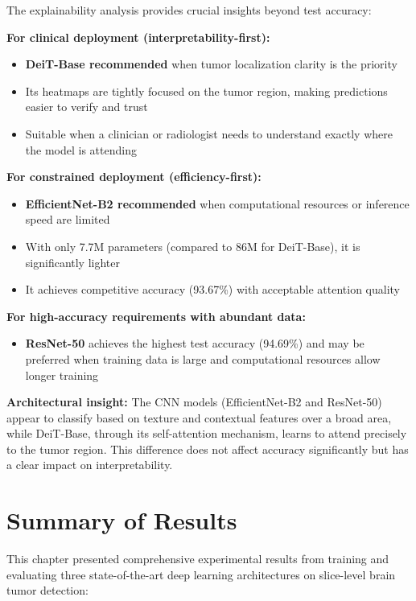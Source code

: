 The explainability analysis provides crucial insights beyond test accuracy:

\textbf{For clinical deployment (interpretability-first):}
\begin{itemize}
    \item \textbf{DeiT-Base recommended} when tumor localization clarity is the priority
    \item Its heatmaps are tightly focused on the tumor region, making predictions easier to verify and trust
    \item Suitable when a clinician or radiologist needs to understand exactly where the model is attending
\end{itemize}

\textbf{For constrained deployment (efficiency-first):}
\begin{itemize}
    \item \textbf{EfficientNet-B2 recommended} when computational resources or inference speed are limited
    \item With only 7.7M parameters (compared to 86M for DeiT-Base), it is significantly lighter
    \item It achieves competitive accuracy (93.67\%) with acceptable attention quality
\end{itemize}

\textbf{For high-accuracy requirements with abundant data:}
\begin{itemize}
    \item \textbf{ResNet-50} achieves the highest test accuracy (94.69\%) and may be preferred when training data is large and computational resources allow longer training
\end{itemize}

\textbf{Architectural insight:}
The CNN models (EfficientNet-B2 and ResNet-50) appear to classify based on texture and contextual features over a broad area, while DeiT-Base, through its self-attention mechanism, learns to attend precisely to the tumor region. This difference does not affect accuracy significantly but has a clear impact on interpretability.

\section{Summary of Results}

This chapter presented comprehensive experimental results from training and evaluating three state-of-the-art deep learning architectures on slice-level brain tumor detection:

